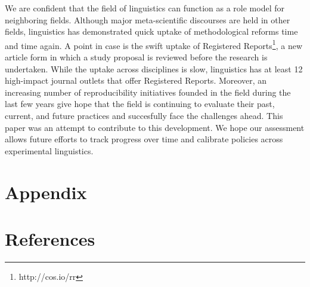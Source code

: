 \documentclass[]{elsarticle} %
\begin{document}
We are confident that the field of linguistics can function as a role model for neighboring fields. Although major meta-scientific discourses are held in other fields, linguistics has demonstrated quick uptake of methodological reforms time and time again. A point in case is the swift uptake of Registered Reports\footnote{http://cos.io/rr}, a new article form in which a study proposal is reviewed before the research is undertaken. While the uptake across disciplines is slow, linguistics has at least 12 high-impact journal outlets that offer Registered Reports. Moreover, an increasing number of reproducibility initiatives founded in the field during the last few years give hope that the field is continuing to evaluate their past, current, and future practices and succesfully face the challenges ahead. This paper was an attempt to contribute to this development. We hope our assessment allows future efforts to track progress over time and calibrate policies across experimental linguistics.

\hypertarget{appendix}{%
\section{Appendix}\label{appendix}}

\hypertarget{references}{%
\section*{References}\label{references}}
\end{document}

